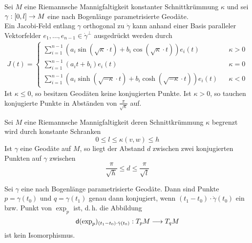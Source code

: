 \documentclass{book}
\renewcommand{\d}{\textsf{d}}
\begin{document}
Sei $M$ eine Riemannsche Mannigfaltigkeit konstanter Schnittkrümmung $\kappa$ und sei $\gamma:[0,l]\overset{}{\rightarrow}M$ eine nach Bogenlänge parametrisierte Geodäte.\\
Ein Jacobi-Feld entlang $\gamma$ orthogonal zu $\dot{\gamma}$ kann anhand einer Basis paralleler Vektorfelder $e_1,\ldots, e_{n-1} \in \dot{\gamma}^\bot$ ausgedrückt werden durch
\begin{align*}
J(t) = 
\left\lbrace
\begin{aligned}
\sum_{i= 1}^{n-1} (a_i \sin(\sqrt{\kappa} \cdot t) + b_i \cos (\sqrt{\kappa}\cdot  t) ) e_i(t) && \kappa > 0\\
\sum_{i= 1}^{n-1} (a_it + b_i ) e_i(t) && \kappa = 0\\
\sum_{i= 1}^{n-1} (a_i \sinh(\sqrt{-\kappa}\cdot t) + b_i \cosh (\sqrt{-\kappa} \cdot t) ) e_i(t) && \kappa < 0
\end{aligned}
\right.
\end{align*}
Ist $\kappa \leq 0$, so besitzen Geodäten keine konjugierten Punkte. Ist $\kappa > 0$, so tauchen konjugierte Punkte in Abständen von $\frac{\pi}{\sqrt{\kappa}}$ auf.

\Kor{}
Sei $M$ eine Riemannsche Mannigfaltigkeit deren Schnittkrümmung $\kappa$ begrenzt wird durch konstante Schranken
\[ 0 \leq l \leq \kappa(v,w) \leq h \]
Ist $\gamma$ eine Geodäte auf $M$, so liegt der Abstand $d$ zwischen zwei konjugierten Punkten auf $\gamma$ zwischen
\[ \frac{\pi}{\sqrt{h}} \leq d \leq \frac{\pi}{\sqrt{l}} \]

Sei $\gamma$ eine nach Bogenlänge parametrisierte Geodäte. Dann sind Punkte $p = \gamma(t_0)$ und $q = \gamma(t_1)$ genau dann konjugiert, wenn $(t_1 - t_0)\cdot\dot{\gamma}(t_0)$ ein  bzw.  Punkt von $\exp_p$ ist, d.\,h. die Abbildung
\[ \d (\exp_p)_{(t_1 - t_0)\cdot\dot{\gamma}(t_0)} : T_pM  \Pfeil{} T_qM \]
ist kein Isomorphismus.
\end{document}
